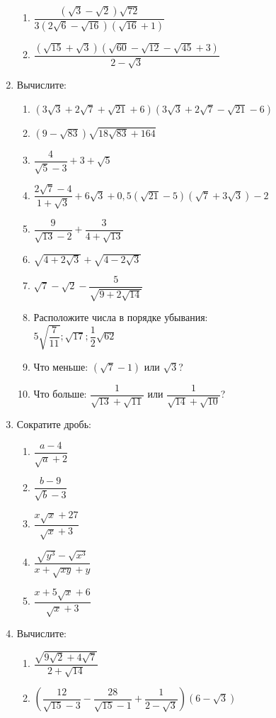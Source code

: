 \documentclass[12pt, a4paper]{article}
\begin{document}
\begin{enumerate}
\begin{enumerate}[label=\textbf{\arabic*)}]
			\item \( \dfrac{(\sqrt{3}-\sqrt{2})\sqrt{72}}{3(2\sqrt{6}-\sqrt{16})(\sqrt{16}+1)} \)
			\item \( \dfrac{(\sqrt{15}+\sqrt{3})(\sqrt{60}-\sqrt{12}-\sqrt{45}+3)}{2-\sqrt{3}} \)
		\end{enumerate}
	\item Вычислите:
		\begin{enumerate}[label=\textbf{\arabic*)}]
			\item \( (3\sqrt{3}+2\sqrt{7}+\sqrt{21}+6)(3\sqrt{3}+2\sqrt{7}-\sqrt{21}-6) \)
			\item \( (9-\sqrt{83})\sqrt{18\sqrt{83}+164} \)
			\item \( \dfrac{4}{\sqrt{5}-3}+3+\sqrt{5} \)
			\item \( \dfrac{2\sqrt{7}-4}{1+\sqrt{3}}+6\sqrt{3}+0,5(\sqrt{21}-5)(\sqrt{7}+3\sqrt{3})-2 \)
			\item \( \dfrac{9}{\sqrt{13}-2}+\dfrac{3}{4+\sqrt{13}} \)
			\item \( \sqrt{4+2\sqrt{3}}+\sqrt{4-2\sqrt{3}} \)
			\item \( \sqrt{7}-\sqrt{2}-\dfrac{5}{\sqrt{9+2\sqrt{14}}} \)
			\item Расположите числа в порядке убывания:\\
			\( 5\sqrt{\dfrac{7}{11}}; \sqrt{17}; \dfrac{1}{2}\sqrt{62} \)
			\item Что меньше:
			\( (\sqrt{7}-1) \) или \( \sqrt{3} \)?
			\item Что больше: \( \dfrac{1}{\sqrt{13}+\sqrt{11}} \) или \( \dfrac{1}{\sqrt{14}+\sqrt{10}} \)?
		\end{enumerate}
	\item Сократите дробь:
		\begin{enumerate}[label=\textbf{\arabic*)}]
			\item \( \dfrac{a-4}{\sqrt{a}+2} \)
			\item \( \dfrac{b-9}{\sqrt{b}-3} \)
			\item \( \dfrac{x\sqrt{x}+27}{\sqrt{x}+3} \)
			\item \( \dfrac{\sqrt{y^3}-\sqrt{x^3}}{x+\sqrt{xy}+y} \)
			\item \( \dfrac{x+5\sqrt{x}+6}{\sqrt{x}+3} \)
		\end{enumerate}
	\item Вычислите:
		\begin{enumerate}[label=\textbf{\arabic*)}]
			\item \( \dfrac{\sqrt{9\sqrt{2}+4\sqrt{7}}}{2+\sqrt{14}} \)
			\item \(\left( \dfrac{12}{\sqrt{15}-3}-\dfrac{28}{\sqrt{15}-1} +\dfrac{1}{2-\sqrt{3}}\right)(6-\sqrt{3})\)

\end{enumerate}
\end{enumerate}
\end{document}
